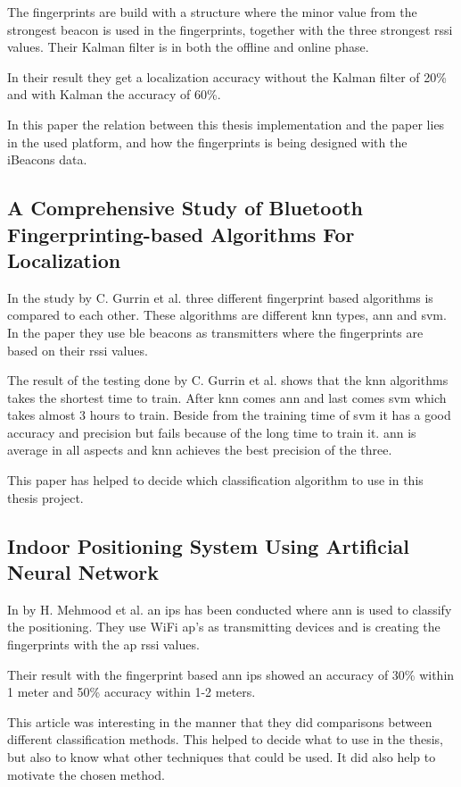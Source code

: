 \bigskip

The fingerprints are build with a structure where the minor value from the strongest beacon is used in the fingerprints, together with the three strongest \acrshort{rssi} values.
Their Kalman filter is in both the offline and online phase.

\bigskip

In their result they get a localization accuracy without the Kalman filter of 20\% and with Kalman the accuracy of 60\%.

\bigskip

In this paper the relation between this thesis implementation and the paper lies in the used platform, and how the fingerprints is being designed with the iBeacons data.


\subsection{A Comprehensive Study of Bluetooth Fingerprinting-based Algorithms For 
Localization}\label{sec:}
In the study \cite{ComprehensiveStudyBluetooth2013} by C. Gurrin et al. three different fingerprint based algorithms is compared to each other.
These algorithms are different \acrshort{knn} types, \acrfull{ann} and \acrfull{svm}.
In the paper they use \acrshort{ble} beacons as transmitters where the fingerprints are based on their \acrshort{rssi} values.

\bigskip

The result of the testing done by C. Gurrin et al. shows that the \acrshort{knn} algorithms takes the shortest time to train.
After \acrshort{knn} comes \acrshort{ann} and last comes \acrshort{svm}  which takes almost 3 hours to train.
Beside from the training time of \acrshort{svm}  it has a good accuracy and precision but fails because of the long time to train it.  \acrshort{ann} is average in all aspects and \acrshort{knn} achieves the best precision of the three.

\bigskip

This paper has helped to decide which classification algorithm to use in this thesis project.

\subsection{Indoor Positioning System Using Artificial Neural Network}\label{sec:}
In \cite{IndoorPositioningSystem2010} by H. Mehmood et al. an \acrshort{ips} has been conducted where \acrshort{ann} is used to classify the positioning.
They use WiFi \acrshort{ap}'s as transmitting devices and is creating the fingerprints with the \acrshort{ap} \acrshort{rssi} values.

\bigskip

Their result with the fingerprint based \acrshort{ann} \acrshort{ips} showed an accuracy of 30\% within 1 meter and 50\% accuracy within 1-2 meters.

\bigskip

This article was interesting in the manner that they did comparisons between different classification methods.
This helped to decide what to use in the thesis, but also to know what other techniques that could be used.
It did also help to motivate the chosen method.
